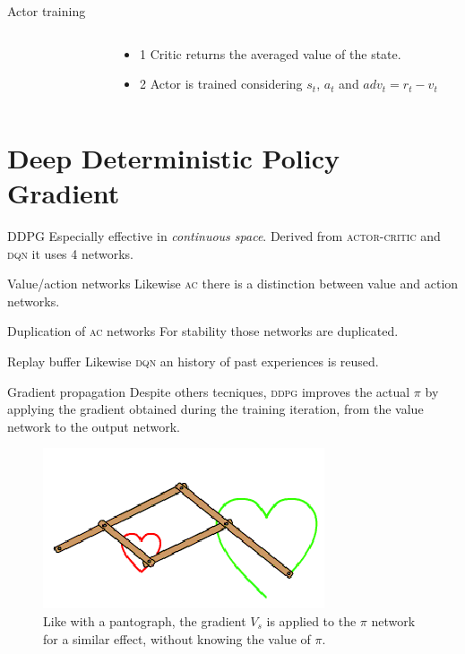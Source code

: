 \documentclass[aspectratio=169]{beamer}
\begin{document}
\begin{frame}{Actor training}
\begin{columns}[c]
\begin{column}{0.5\textwidth}
\begin{figure}
\begin{tikzpicture}[x=0.75pt,y=0.75pt,yscale=-1,xscale=1]
\end{tikzpicture}

		\end{figure}
		\end{column}
		\begin{column}{0.5\textwidth}
			\centering
			\begin{itemize}
				\item\alert{1} Critic returns the averaged value of the state.
				\item\alert{2} Actor is trained considering $s_t$, $a_t$ and $adv_t =r_t-v_t$ 
			\end{itemize}
		\end{column}
		
	\end{columns}

\end{frame}

\section{Deep Deterministic Policy Gradient}
\begin{frame}{DDPG}
	Especially effective in \textit{continuous space}.
	Derived from \textsc{actor-critic} and \textsc{dqn} it uses 4 networks. 
	\begin{alertblock}{Value/action networks}
		Likewise \textsc{ac} there is a distinction between value and action networks.
	\end{alertblock}
	\begin{alertblock}{Duplication of \textsc{ac} networks}
		For stability those networks are duplicated.
	\end{alertblock}	
	\begin{alertblock}{Replay buffer}
		Likewise \textsc{dqn} an history of past experiences is reused.
	\end{alertblock}	
\end{frame}
\begin{frame}{Gradient propagation}
	Despite others tecniques, \textsc{ddpg} improves the actual $\pi$ by applying the gradient obtained during the training iteration, from the value network to the output network.
	\begin{figure}[t!]	
	\centering
	\includegraphics[scale=2]{img/pantograph.png}
	\caption{Like with a pantograph, the gradient $V_s$ is applied to the $\pi$ network for a similar effect, without knowing the value of $\pi$.}
	\end{figure}
\end{frame}
\end{document}
